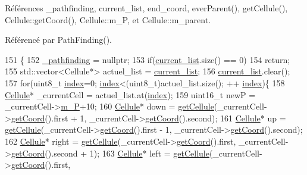 Références \-\_\-pathfinding, current\-\_\-list, end\-\_\-coord, ever\-Parent(), get\-Cellule(), Cellule\-::get\-Coord(), Cellule\-::m\-\_\-\-P, et Cellule\-::m\-\_\-parent.



Référencé par Path\-Finding().


\begin{DoxyCode}
151                    \{
152         \hyperlink{classPathFinding_ada148538e4a78dcc97f24ae74156abd4}{\_pathfinding} = \textcolor{keyword}{nullptr};
153         \textcolor{keywordflow}{if}(\hyperlink{classPathFinding_aac0f1388f79b45388470d634c909174e}{current\_list}.size() == 0)
154             \textcolor{keywordflow}{return};
155         std::vector<Cellule*> actuel\_list = \hyperlink{classPathFinding_aac0f1388f79b45388470d634c909174e}{current\_list};
156         \hyperlink{classPathFinding_aac0f1388f79b45388470d634c909174e}{current\_list}.clear();
157         \textcolor{keywordflow}{for}(uint8\_t \hyperlink{server_8cpp_a30792c4b007e8273d3832fe2d5e70987}{index}=0; \hyperlink{server_8cpp_a30792c4b007e8273d3832fe2d5e70987}{index}<(uint8\_t)actuel\_list.size(); ++
      \hyperlink{server_8cpp_a30792c4b007e8273d3832fe2d5e70987}{index})\{
158             \hyperlink{classCellule}{Cellule}* \_currentCell = actuel\_list.at(\hyperlink{server_8cpp_a30792c4b007e8273d3832fe2d5e70987}{index});
159             uint16\_t newP = \_currentCell->\hyperlink{classCellule_af7cb9856701ea3e423f58b09bb7dfdbd}{m\_P}+10;
160             \hyperlink{classCellule}{Cellule}* down = \hyperlink{classPathFinding_a3817cc8f9d1604bf34a5a3b4f878b3da}{getCellule}(\_currentCell->\hyperlink{classCellule_a50698c84ba5a043a148a594552189427}{getCoord}().first + 1, 
      \_currentCell->\hyperlink{classCellule_a50698c84ba5a043a148a594552189427}{getCoord}().second);
161             \hyperlink{classCellule}{Cellule}* up = \hyperlink{classPathFinding_a3817cc8f9d1604bf34a5a3b4f878b3da}{getCellule}(\_currentCell->\hyperlink{classCellule_a50698c84ba5a043a148a594552189427}{getCoord}().first - 1, 
      \_currentCell->\hyperlink{classCellule_a50698c84ba5a043a148a594552189427}{getCoord}().second);
162             \hyperlink{classCellule}{Cellule}* right = \hyperlink{classPathFinding_a3817cc8f9d1604bf34a5a3b4f878b3da}{getCellule}(\_currentCell->\hyperlink{classCellule_a50698c84ba5a043a148a594552189427}{getCoord}().first, 
      \_currentCell->\hyperlink{classCellule_a50698c84ba5a043a148a594552189427}{getCoord}().second + 1);
163             \hyperlink{classCellule}{Cellule}* left = \hyperlink{classPathFinding_a3817cc8f9d1604bf34a5a3b4f878b3da}{getCellule}(\_currentCell->\hyperlink{classCellule_a50698c84ba5a043a148a594552189427}{getCoord}().first, 

\end{DoxyCode}

